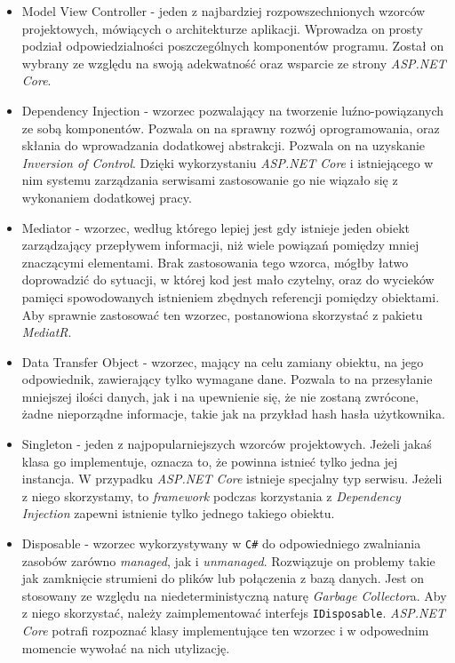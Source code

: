 \begin{itemize}
	\item Model View Controller - jeden z najbardziej rozpowszechnionych wzorców projektowych, mówiących o architekturze aplikacji. Wprowadza on prosty podział odpowiedzialności poszczególnych komponentów programu. Został on wybrany ze względu na swoją adekwatność oraz wsparcie ze strony \emph{ASP.NET Core}.
	\item Dependency Injection - wzorzec pozwalający na tworzenie luźno-powiązanych ze sobą komponentów. Pozwala on na sprawny rozwój oprogramowania, oraz skłania do wprowadzania dodatkowej abstrakcji. Pozwala on na uzyskanie \emph{Inversion of Control}. Dzięki wykorzystaniu \emph{ASP.NET Core} i istniejącego w nim systemu zarządzania serwisami zastosowanie go nie wiązało się z wykonaniem dodatkowej pracy.
	\item Mediator - wzorzec, według którego lepiej jest gdy istnieje jeden obiekt zarządzający przepływem informacji, niż wiele powiązań pomiędzy mniej znaczącymi elementami. Brak zastosowania tego wzorca, mógłby łatwo doprowadzić do sytuacji, w której kod jest mało czytelny, oraz do wycieków pamięci spowodowanych istnieniem zbędnych referencji pomiędzy obiektami. Aby sprawnie zastosować ten wzorzec, postanowiona skorzystać z pakietu \emph{MediatR}.
	\item Data Transfer Object - wzorzec, mający na celu zamiany obiektu, na jego odpowiednik, zawierający tylko wymagane dane. Pozwala to na przesyłanie mniejszej ilości danych, jak i na upewnienie się, że nie zostaną zwrócone, żadne nieporządne informacje, takie jak na przykład hash hasła użytkownika.
	\item Singleton - jeden z najpopularniejszych wzorców projektowych. Jeżeli jakaś klasa go implementuje, oznacza to, że powinna istnieć tylko jedna jej instancja. W przypadku \emph{ASP.NET Core} istnieje specjalny typ serwisu. Jeżeli z niego skorzystamy, to \emph{framework} podczas korzystania z \emph{Dependency Injection} zapewni istnienie tylko jednego takiego obiektu.
	\item Disposable - wzorzec wykorzystywany w \texttt{C\#} do odpowiedniego zwalniania zasobów zarówno \emph{managed}, jak i \emph{unmanaged}. Rozwiązuje on problemy takie jak zamknięcie strumieni do plików lub połączenia z bazą danych. Jest on stosowany ze względu na niedeterministyczną naturę \emph{Garbage Collector}a. Aby z niego skorzystać, należy zaimplementować interfejs \texttt{IDisposable}. \emph{ASP.NET Core} potrafi rozpoznać klasy implementujące ten wzorzec i w odpowednim momencie wywołać na nich utylizację.
\end{itemize}

